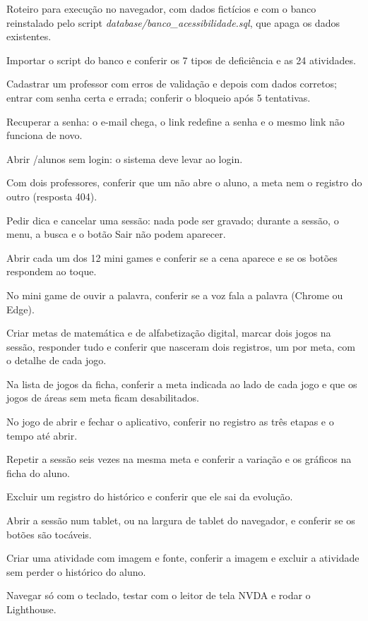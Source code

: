 
\label{ap:B}

Roteiro para execução no navegador, com dados fictícios e com o banco reinstalado pelo script \textit{database/banco\_acessibilidade.sql}, que apaga os dados existentes.

\begin{conferir}
  \item Importar o script do banco e conferir os 7 tipos de deficiência e as 24 atividades.
  \item Cadastrar um professor com erros de validação e depois com dados corretos; entrar com senha certa e errada; conferir o bloqueio após 5 tentativas.
  \item Recuperar a senha: o e-mail chega, o link redefine a senha e o mesmo link não funciona de novo.
  \item Abrir /alunos sem login: o sistema deve levar ao login.
  \item Com dois professores, conferir que um não abre o aluno, a meta nem o registro do outro (resposta 404).
  \item Pedir dica e cancelar uma sessão: nada pode ser gravado; durante a sessão, o menu, a busca e o botão Sair não podem aparecer.
  \item Abrir cada um dos 12 mini games e conferir se a cena aparece e se os botões respondem ao toque.
  \item No mini game de ouvir a palavra, conferir se a voz fala a palavra (Chrome ou Edge).
  \item Criar metas de matemática e de alfabetização digital, marcar dois jogos na sessão, responder tudo e conferir que nasceram dois registros, um por meta, com o detalhe de cada jogo.
  \item Na lista de jogos da ficha, conferir a meta indicada ao lado de cada jogo e que os jogos de áreas sem meta ficam desabilitados.
  \item No jogo de abrir e fechar o aplicativo, conferir no registro as três etapas e o tempo até abrir.
  \item Repetir a sessão seis vezes na mesma meta e conferir a variação e os gráficos na ficha do aluno.
  \item Excluir um registro do histórico e conferir que ele sai da evolução.
  \item Abrir a sessão num tablet, ou na largura de tablet do navegador, e conferir se os botões são tocáveis.
  \item Criar uma atividade com imagem e fonte, conferir a imagem e excluir a atividade sem perder o histórico do aluno.
  \item Navegar só com o teclado, testar com o leitor de tela NVDA e rodar o Lighthouse.
\end{conferir}
